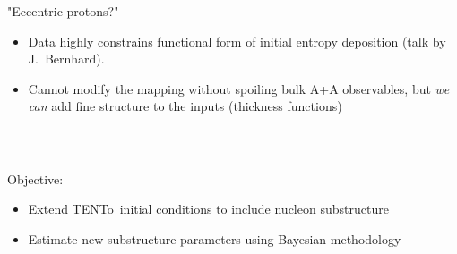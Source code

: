 \documentclass[aspectratio=43]{beamer}
\theoremstyle{definition}
\newcommand{\trento}{T\raisebox{-0.3ex}{R}ENTo}
\begin{document}
\begin{frame}{"Eccentric protons?" \quad {\scriptsize \textcolor{offblack}{Schenke, Venugopalan PRL 113 102301}}}
  \small
  \begin{itemize}
    \item Data highly constrains functional form of initial entropy deposition (talk by J.\ Bernhard).\\[1ex]
    \item Cannot modify the mapping without spoiling bulk A+A observables, but \emph{we can} add
          fine structure to the inputs (thickness functions)\\[2ex]
  \end{itemize}
  \centering
   \\[2ex]

\end{frame}

\begin{frame}
  \begin{columns}
    \begin{column}{.8\textwidth}
    \centering
    {\Large Objective:}\\[1ex]
    \begin{itemize}
      \item Extend \trento\ initial conditions to include nucleon substructure\\[1ex]
      \item Estimate new substructure parameters using Bayesian methodology 
    \end{itemize}
    \end{column}
  \end{columns}
\end{frame}
\end{document}
